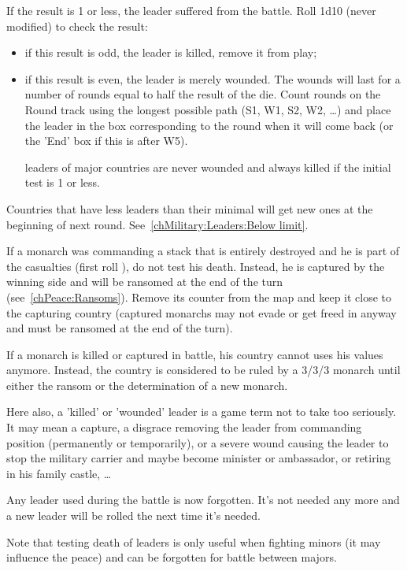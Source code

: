 If the result is 1 or less, the leader suffered from the battle. Roll 1d10
(never modified) to check the result:
\begin{itemize}
\item if this result is odd, the leader is killed, remove it from play;
\item if this result is even, the leader is merely wounded. The wounds will
  last for a number of rounds equal to half the result of the die. Count
  rounds on the Round track using the longest possible path (S1, W1, S2, W2,
  \ldots) and place the leader in the box corresponding to the round when it
  will come back (or the 'End' box if this is after W5).

  \anonyme leaders of major countries are never wounded and always killed if
  the initial test is 1 or less.
\end{itemize}

Countries that have less leaders than their minimal will get new ones at the
beginning of next round. See~\ref{chMilitary:Leaders:Below limit}.

If a monarch was commanding a stack that is entirely destroyed and he is part
of the casualties (first roll ), do not test his death. Instead, he is
captured by the winning side and will be ransomed at the end of the
turn (see~\ref{chPeace:Ransoms}). Remove its counter from the map and keep it
close to the capturing country (captured monarchs may not evade or get freed
in anyway and must be ransomed at the end of the turn).

If a monarch is killed or captured in battle, his country cannot uses his
values anymore. Instead, the country is considered to be ruled by a 3/3/3
monarch until either the ransom or the determination of a new monarch.

\begin{designnote}
  Here also, a 'killed' or 'wounded' leader is a game term not to take too
  seriously. It may mean a capture, a disgrace removing the leader from
  commanding position (permanently or temporarily), or a severe wound causing
  the leader to stop the military carrier and maybe become minister or
  ambassador, or retiring in his family castle, \ldots
\end{designnote}

Any  leader used during the battle is now forgotten. It's
not needed any more and a new  leader will be rolled the
next time it's needed.

Note that testing death of  leaders is only useful when
fighting minors (it may influence the peace) and can be forgotten for battle
between majors.

